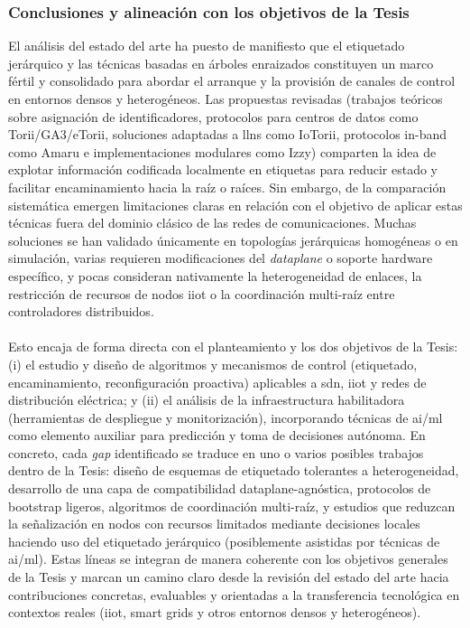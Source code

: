 \subsubsection{Conclusiones y alineación con los objetivos de la Tesis}
\label{subsubsec:conclu_etiquetado}
El análisis del estado del arte ha puesto de manifiesto que el etiquetado jerárquico y las técnicas basadas en árboles enraizados constituyen un marco fértil y consolidado para abordar el arranque y la provisión de canales de control en entornos densos y heterogéneos. Las propuestas revisadas (trabajos teóricos sobre asignación de identificadores, protocolos para centros de datos como Torii/GA3/eTorii, soluciones adaptadas a \gls{llns} como IoTorii, protocolos in-band como Amaru e implementaciones modulares como Izzy) comparten la idea de explotar información codificada localmente en etiquetas para reducir estado y facilitar encaminamiento hacia la raíz o raíces. Sin embargo, de la comparación sistemática emergen limitaciones claras en relación con el objetivo de aplicar estas técnicas fuera del dominio clásico de las redes de comunicaciones. Muchas soluciones se han validado únicamente en topologías jerárquicas homogéneas o en simulación, varias requieren modificaciones del \textit{dataplane} o soporte hardware específico, y pocas consideran nativamente la heterogeneidad de enlaces, la restricción de recursos de nodos \gls{iiot} o la coordinación multi-raíz entre controladores distribuidos.\\
\\
Esto encaja de forma directa con el planteamiento y los dos objetivos de la Tesis: (i) el estudio y diseño de algoritmos y mecanismos de control (etiquetado, encaminamiento, reconfiguración proactiva) aplicables a \gls{sdn}, \gls{iiot} y redes de distribución eléctrica; y (ii) el análisis de la infraestructura habilitadora (herramientas de despliegue y monitorización), incorporando técnicas de \gls{ai}/\gls{ml} como elemento auxiliar para predicción y toma de decisiones autónoma. En concreto, cada \textit{gap} identificado se traduce en uno o varios posibles trabajos dentro de la Tesis: diseño de esquemas de etiquetado tolerantes a heterogeneidad, desarrollo de una capa de compatibilidad dataplane-agnóstica, protocolos de bootstrap ligeros, algoritmos de coordinación multi-raíz, y estudios que reduzcan la señalización en nodos con recursos limitados mediante decisiones locales haciendo uso del etiquetado jerárquico (posiblemente asistidas por técnicas de \gls{ai}/\gls{ml}). Estas líneas se integran de manera coherente con los objetivos generales de la Tesis y marcan un camino claro desde la revisión del estado del arte hacia contribuciones concretas, evaluables y orientadas a la transferencia tecnológica en contextos reales (\gls{iiot}, smart grids y otros entornos densos y heterogéneos).




